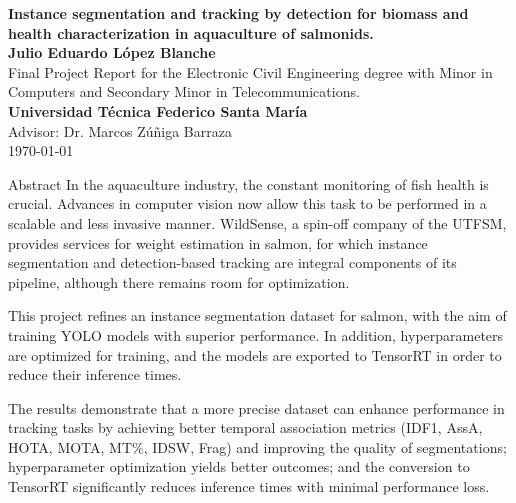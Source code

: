 \normalsize
{}
\newpage

\begin{center}
    {\singlespacing\Large{\textbf{Instance segmentation and tracking by detection for biomass and health characterization in aquaculture of salmonids.}}}\\
    
    \normalsize
    \textbf{Julio Eduardo López Blanche}\\

    Final Project Report for the Electronic Civil Engineering degree with Minor in Computers and Secondary Minor in Telecommunications.\\

    \textbf{Universidad Técnica Federico Santa María}\\

    Advisor: Dr. Marcos Zúñiga Barraza\\

    \monthyeardate\today
\end{center}

\begin{poliabstract}{Abstract} 
\normalsize
In the aquaculture industry, the constant monitoring of fish health is crucial. Advances in computer vision now allow this task to be performed in a scalable and less invasive manner. WildSense, a spin-off company of the UTFSM, provides services for weight estimation in salmon, for which instance segmentation and detection-based tracking are integral components of its pipeline, although there remains room for optimization.

This project refines an instance segmentation dataset for salmon, with the aim of training YOLO models with superior performance. In addition, hyperparameters are optimized for training, and the models are exported to TensorRT in order to reduce their inference times.

The results demonstrate that a more precise dataset can enhance performance in tracking tasks by achieving better temporal association metrics (IDF1, AssA, HOTA, MOTA, MT\%, IDSW, Frag) and improving the quality of segmentations; hyperparameter optimization yields better outcomes; and the conversion to TensorRT significantly reduces inference times with minimal performance loss.
\end{poliabstract}

\normalsize
{}

